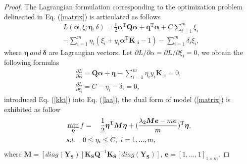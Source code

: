 \documentclass[a4paper]{cas-sc}
\begin{document}
\begin{proof}
The Lagrangian formulation corresponding to the optimization problem delineated in Eq. (\ref{matrix}) is articulated as follows
\begin{equation}
\begin{aligned}
\label{laa}
&L(\boldsymbol{\alpha}, \xi ;\boldsymbol{\eta}, \delta ) = \frac{1}{2}{\boldsymbol{\alpha} ^{\mathrm{T}}}\boldsymbol{Q}\boldsymbol{\alpha}  + {\boldsymbol{q}^{\mathrm{T}}}\boldsymbol{\alpha}  + C \sum\limits_{i = 1}^m {{\xi _i}} \\
 &- \sum\limits_{i = 1}^m {{{\eta} _i}({\xi _i} + {y_i}{\boldsymbol{\alpha} ^{\mathrm{T}}}{ \boldsymbol{\boldsymbol{K_{:i}}}} - 1)}- \sum\limits_{i = 1}^m {{\delta _i}{\xi _i}},
\end{aligned}
\end{equation}
where $\boldsymbol{\eta}\ and\ \boldsymbol{\delta}$ are Lagrangian vectors. Let $\partial {L}/\partial {\alpha } = \partial {L}/\partial {\xi }_{i} = 0$, we obtain the following formulas
\begin{equation}
\begin{array}{l}
\label{kkt}
\frac{{\partial {L}}}{{\partial \boldsymbol{\alpha} }} = \boldsymbol{Q}\boldsymbol{\alpha}  + \boldsymbol{q} - \sum\limits_{i = 1}^m {{{\eta} _i}{y_i}{ \boldsymbol{\boldsymbol{K_{:i}}}}  }  = 0,\\
\frac{{\partial {L}}}{{\partial {\xi _i}}} = C - {{\eta} _i} - {\delta _i} = 0, 
\end{array}
\end{equation}
introduced Eq. (\ref{kkt}) into Eq. (\ref{laa}), the dual form of model (\ref{matrix}) is exhibited as follow
\begin{equation}
\begin{aligned}
\label{end}
&\mathop {\min } \limits_{\boldsymbol{\eta}} f= \quad {\rm{   }}\frac{1}{2}{\boldsymbol{\eta}^{\mathrm{T}}}\boldsymbol{M}\boldsymbol{\eta} + {(\frac{{{\lambda _2}\boldsymbol{M}\boldsymbol{e} - m\boldsymbol{e}}}{m})^{\mathrm{T}}}\boldsymbol{\eta}, \\
& s.t.\quad  0 \le \eta_i  \le {C} ,\ i = 1,...,m,
\end{aligned}
\end{equation}
where $\boldsymbol{M}=[diag(\boldsymbol{Y_S})] \boldsymbol{K_S} {\boldsymbol{Q}^{ - 1}}\boldsymbol{K_S}[diag(\boldsymbol{Y_S})]$, $\boldsymbol{e} = {[1,...,1]_{1 \times m}}$.
\end{proof}
\end{document}
